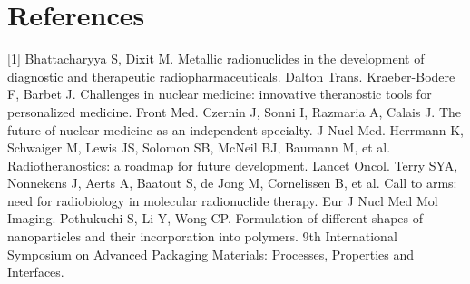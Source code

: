 \documentclass{article}
\begin{document}
\section*{References}
[1] Bhattacharyya S, Dixit M. Metallic radionuclides in the development of diagnostic and therapeutic radiopharmaceuticals. Dalton Trans. 
\newline
[2] Kraeber-Bodere F, Barbet J. Challenges in nuclear medicine: innovative theranostic tools for personalized medicine. Front Med.
\newline
[3] Czernin J, Sonni I, Razmaria A, Calais J. The future of nuclear medicine as an independent specialty. J Nucl Med. 
\newline
[4] Herrmann K, Schwaiger M, Lewis JS, Solomon SB, McNeil BJ, Baumann M, et al. Radiotheranostics: a roadmap for future development. Lancet Oncol. 
\newline
[5] Terry SYA, Nonnekens J, Aerts A, Baatout S, de Jong M, Cornelissen B, et al. Call to arms: need for radiobiology in molecular radionuclide therapy. Eur J Nucl Med Mol Imaging.
\newline
[6] Pothukuchi S, Li Y, Wong CP. Formulation of different shapes of nanoparticles and their incorporation into polymers. 9th International Symposium on Advanced Packaging Materials: Processes, Properties and Interfaces.
\end{document}
